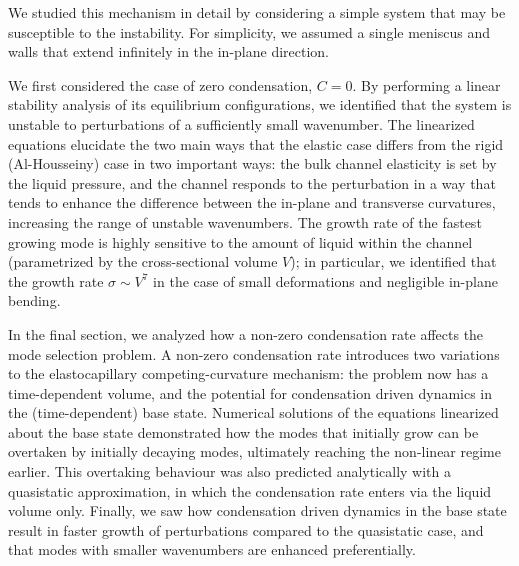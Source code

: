 We studied this mechanism in detail by considering a simple system that may be susceptible to the instability. For simplicity, we assumed a single meniscus and walls that extend infinitely in the in-plane direction.

We first considered the case of zero condensation, $C = 0$. By performing a linear stability analysis of its equilibrium configurations, we identified that the system is unstable to perturbations of a sufficiently small wavenumber. The linearized equations elucidate the two main ways that the elastic case differs from the rigid (Al-Housseiny) case in two important ways: the bulk channel elasticity is set by the liquid pressure, and the channel responds to the perturbation in a way that tends to enhance the difference between the in-plane and transverse curvatures, increasing the range of unstable wavenumbers. The growth rate of the fastest growing mode is highly sensitive to the amount of liquid within the channel (parametrized by the cross-sectional volume $V$); in particular, we identified that the growth rate $\sigma \sim V^7$ in the case of small deformations and negligible in-plane bending.

In the final section, we analyzed how a non-zero condensation rate affects the mode selection problem. A non-zero condensation rate introduces two variations to the elastocapillary competing-curvature mechanism:  the problem now has a time-dependent volume, and the potential for condensation driven dynamics in the (time-dependent) base state. Numerical solutions of the equations linearized about the base state demonstrated how the modes that initially grow can be overtaken by initially decaying modes, ultimately reaching the non-linear regime earlier. This overtaking behaviour was also predicted analytically with a quasistatic approximation, in which the condensation rate enters via the liquid volume only. Finally, we saw how condensation driven dynamics in the base state result in faster growth of perturbations compared to the quasistatic case, and that modes with smaller wavenumbers are enhanced preferentially.

